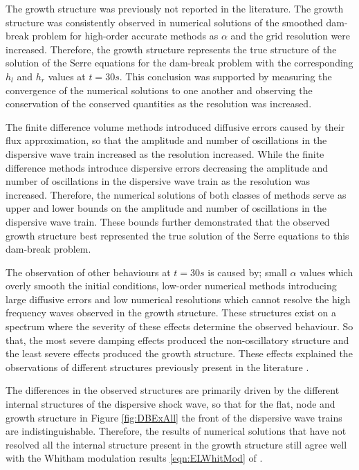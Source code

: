 The growth structure was previously not reported in the literature. The growth structure was consistently observed in numerical solutions of the smoothed dam-break problem for high-order accurate methods as $\alpha$ and the grid resolution were increased. Therefore, the growth structure represents the true structure of the solution of the Serre equations for the dam-break problem with the corresponding $h_l$ and $h_r$ values at $t=30s$. This conclusion was supported by measuring the convergence of the numerical solutions to one another and observing the conservation of the conserved quantities as the resolution was increased. 

The finite difference volume methods introduced diffusive errors caused by their flux approximation, so that the amplitude and number of oscillations in the dispersive wave train increased as the resolution increased. While the finite difference methods introduce dispersive errors decreasing the amplitude and number of oscillations in the dispersive wave train as the resolution was increased. Therefore, the numerical solutions of both classes of methods serve as upper and lower bounds on the amplitude and number of oscillations in the dispersive wave train. These bounds further demonstrated that the observed growth structure best represented the true solution of the Serre equations to this dam-break problem. 

The observation of other behaviours at $t=30s$ is caused by; small $\alpha$ values which overly smooth the initial conditions, low-order numerical methods introducing large diffusive errors and low numerical resolutions which cannot resolve the high frequency waves observed in the growth structure. These structures exist on a spectrum where the severity of these effects determine the observed behaviour. So that, the most severe damping effects produced the non-oscillatory structure and the least severe effects produced the growth structure. These effects explained the observations of different structures previously present in the literature \cite{El-etal-2006,Hank-etal-2010-2034,Mitsotakis-etal-2014,Mitsotakis-etal-2017}. 

The differences in the observed structures are primarily driven by the different internal structures of the dispersive shock wave, so that for the flat, node and growth structure in Figure \ref{fig:DBExAll} the front of the dispersive wave trains are indistinguishable. Therefore, the results of numerical solutions that have not resolved all the internal structure present in the growth structure still agree well with the Whitham modulation results \eqref{eqn:ELWhitMod} of \citet{El-etal-2006}.

